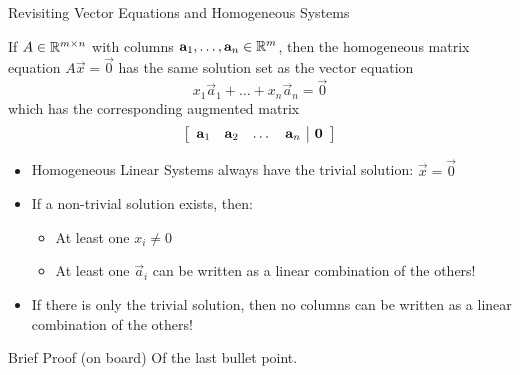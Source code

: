 \documentclass[xcoler=dvipsnames, aspectratio=169]{beamer}
\date{Linear Independence}
\begin{document}
\begin{frame}{Revisiting Vector Equations and Homogeneous Systems}
    \begin{tcolorbox}
        If $A\in\R^{m\times n}$ with columns $\vec{a}_1,\dots,\vec{a}_n\in\R^m$, then the 
        homogeneous matrix equation $A\vec{x} = \vec{0}$ has the same solution set as the vector 
        equation
        \[
            x_1\vec{a}_1 + \dots + x_n\vec{a}_n = \vec{0}
        \]
        which has the corresponding augmented matrix
        \[
            \aMat{cccc|c}{
                \vec{a}_1 & \vec{a}_2 & \dots & \vec{a}_n & \vec{0}
            }
        \]
    \end{tcolorbox}
    \pause
    \begin{itemize}
        \item Homogeneous Linear Systems always have the trivial solution: $\vec{x}=\vec{0}$\pause
        \item If a non-trivial solution exists, then: \pause
            \begin{itemize}
                \item At least one $x_i\neq 0$\pause
                \item At least one $\vec{a}_i$ can be written as a linear combination of the others!\pause
            \end{itemize}
        \item If there is only the trivial solution, then no columns can be written as a linear combination
            of the others!
    \end{itemize}
\end{frame}
\begin{frame}{Brief Proof (on board) Of the last bullet point.}
\end{frame}
\end{document}
